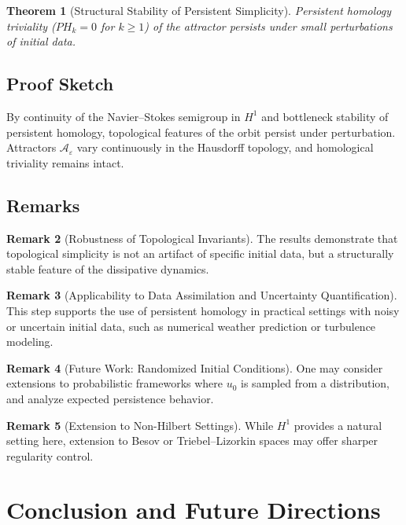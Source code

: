 \documentclass[11pt]{article}
\newtheorem{theorem}{Theorem}[section]
\theoremstyle{definition}
\newtheorem{remark}[theorem]{Remark}
\begin{document}
\begin{theorem}[Structural Stability of Persistent Simplicity]
Persistent homology triviality ($PH_k = 0$ for $k \ge 1$) of the attractor persists under small perturbations of initial data.
\end{theorem}

\subsection*{Proof Sketch}
By continuity of the Navier--Stokes semigroup in $H^1$ and bottleneck stability of persistent homology, topological features of the orbit persist under perturbation. Attractors $\mathcal{A}_\varepsilon$ vary continuously in the Hausdorff topology, and homological triviality remains intact.

\subsection*{Remarks}

\begin{remark}[Robustness of Topological Invariants]
The results demonstrate that topological simplicity is not an artifact of specific initial data, but a structurally stable feature of the dissipative dynamics.
\end{remark}

\begin{remark}[Applicability to Data Assimilation and Uncertainty Quantification]
This step supports the use of persistent homology in practical settings with noisy or uncertain initial data, such as numerical weather prediction or turbulence modeling.
\end{remark}

\begin{remark}[Future Work: Randomized Initial Conditions]
One may consider extensions to probabilistic frameworks where $u_0$ is sampled from a distribution, and analyze expected persistence behavior.
\end{remark}

\begin{remark}[Extension to Non-Hilbert Settings]
While $H^1$ provides a natural setting here, extension to Besov or Triebel–Lizorkin spaces may offer sharper regularity control.
\end{remark}


\section{Conclusion and Future Directions}
\label{sec:conclusion}
\end{document}
